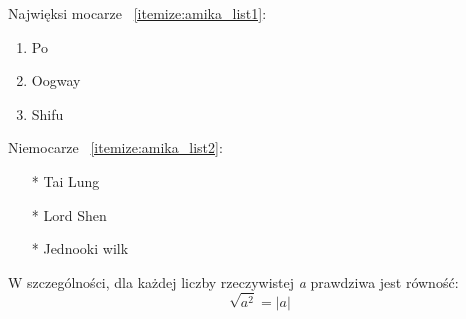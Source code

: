 Najwięksi mocarze ~\ref{itemize:amika_list1}:
\begin{enumerate}
  \item Po
  \item Oogway
  \item Shifu
  \label{itemize:amika_list1}
\end{enumerate}

\bigskip

Niemocarze ~\ref{itemize:amika_list2}:
\begin{itemize}
  \item[*] Tai Lung
  \item[*] Lord Shen
  \item[*] Jednooki wilk
  \label{itemize:amika_list2}
\end{itemize}



W szczególności, dla każdej liczby rzeczywistej {\it a} prawdziwa jest równość:
 \[\sqrt{a^2} = |a|\]